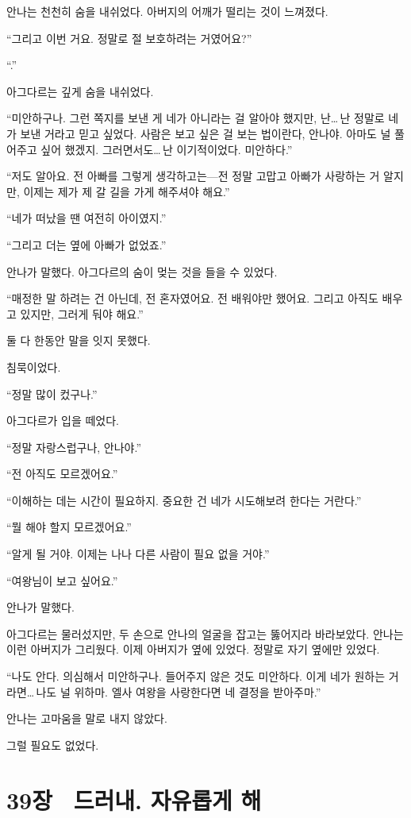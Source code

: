 안나는 천천히 숨을 내쉬었다. 아버지의 어깨가 떨리는 것이 느껴졌다.

``그리고 이번 거요. 정말로 절 보호하려는 거였어요?''

``.''

아그다르는 깊게 숨을 내쉬었다.

``미안하구나. 그런 쪽지를 보낸 게 네가 아니라는 걸 알아야 했지만, 난\ldots\,난 정말로 네가 보낸 거라고 믿고 싶었다. 사람은 보고 싶은 걸 보는 법이란다, 안나야. 아마도 널 풀어주고 싶어 했겠지. 그러면서도\ldots\,난 이기적이었다. 미안하다.''

``저도 알아요. 전 아빠를 그렇게 생각하고는—전 정말 고맙고 아빠가 사랑하는 거 알지만, 이제는 제가 제 갈 길을 가게 해주셔야 해요.''

``네가 떠났을 땐 여전히 아이였지.''

``그리고 더는 옆에 아빠가 없었죠.''

안나가 말했다. 아그다르의 숨이 멎는 것을 들을 수 있었다.

``매정한 말 하려는 건 아닌데, 전 혼자였어요. 전 배워야만 했어요. 그리고 아직도 배우고 있지만, 그러게 둬야 해요.''

둘 다 한동안 말을 잇지 못했다.

 침묵이었다.

``정말 많이 컸구나.''

아그다르가 입을 떼었다.

``정말 자랑스럽구나, 안나야.''

``전 아직도 모르겠어요.''

``이해하는 데는 시간이 필요하지. 중요한 건 네가 시도해보려 한다는 거란다.''

``뭘 해야 할지 모르겠어요.''

``알게 될 거야. 이제는 나나 다른 사람이 필요 없을 거야.''

``여왕님이 보고 싶어요.''

안나가 말했다.

아그다르는 물러섰지만, 두 손으로 안나의 얼굴을 잡고는 뚫어지라 바라보았다. 안나는 이런 아버지가 그리웠다. 이제 아버지가 옆에 있었다. 정말로 자기 옆에만 있었다.

``나도 안다. 의심해서 미안하구나. 들어주지 않은 것도 미안하다. 이게 네가 원하는 거라면\ldots\,나도 널 위하마. 엘사 여왕을 사랑한다면 네 결정을 받아주마.''

안나는 고마움을 말로 내지 않았다.

그럴 필요도 없었다.



\chapter[39장  드러내. 자유롭게 해][39장\hspace*{.5em}드러내. 자유롭게 해]{39장 \ 드러내. 자유롭게 해}




